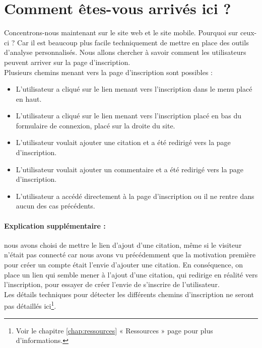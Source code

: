 \documentclass{report}
\begin{document}
	\section{Comment êtes-vous arrivés ici ?}
	Concentrons-nous maintenant sur le site web et le site mobile. Pourquoi sur ceux-ci ? Car il est beaucoup plus facile techniquement de mettre en place des outils d'analyse personnalisés. Nous allons chercher à savoir comment les utilisateurs peuvent arriver sur la page d'inscription.\\

	Plusieurs chemins menant vers la page d'inscription sont possibles :
	\vspace{10px}
	\begin{itemize}
		\item L'utilisateur a cliqué sur le lien menant vers l'inscription dans le menu placé en haut.
		\item L'utilisateur a cliqué sur le lien menant vers l'inscription placé en bas du formulaire de connexion, placé sur la droite du site.
		\item L'utilisateur voulait ajouter une citation et a été redirigé vers la page d'inscription.
		\item L'utilisateur voulait ajouter un commentaire et a été redirigé vers la page d'inscription.
		\item L'utilisateur a accédé directement à la page d'inscription ou il ne rentre dans aucun des cas précédents.
	\end{itemize}
	\vspace{10px}
	\paragraph{Explication supplémentaire :}nous avons choisi de mettre le lien d'ajout d'une citation, même si le visiteur n'était pas connecté car nous avons vu précédemment que la motivation première pour créer un compte était l'envie d'ajouter une citation. En conséquence, on place un lien qui semble mener à l'ajout d'une citation, qui redirige en réalité vers l'inscription, pour essayer de créer l'envie de s'inscrire de l'utilisateur.\\

	Les détails techniques pour détecter les différents chemins d'inscription ne seront pas détaillés ici\footnote{Voir le chapitre \ref{chap:ressources} « Ressources » page \pageref{chap:ressources} pour plus d'informations.}.\\
\end{document}
